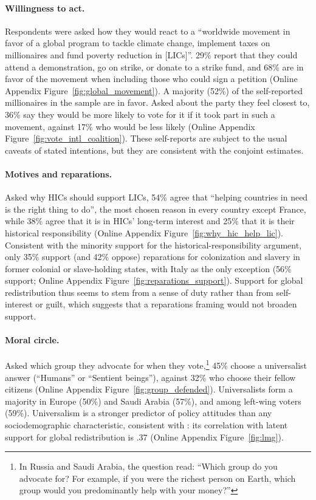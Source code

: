 \documentclass[12pt,english]{article}
\begin{document}
\paragraph{Willingness to act.}\label{par:willingness_act} Respondents were asked how they would react to a ``worldwide movement in favor of a global program to tackle climate change, implement taxes on millionaires and fund poverty reduction in [LICs]''. 29\% report that they could attend a demonstration, go on strike, or donate to a strike fund, and 68\% are in favor of the movement when including those who could sign a petition (Online Appendix Figure~\ref{fig:global_movement}). A majority (52\%) of the self-reported millionaires in the sample are in favor. Asked about the party they feel closest to, 36\% say they would be more likely to vote for it if it took part in such a movement, against 17\% who would be less likely (Online Appendix Figure~\ref{fig:vote_intl_coalition}). These self-reports are subject to the usual caveats of stated intentions, but they are consistent with the conjoint estimates.

\paragraph{Motives and reparations.}\label{par:why_help_lic}\label{par:reparations} Asked why HICs should support LICs, 54\% agree that ``helping countries in need is the right thing to do'', the most chosen reason in every country except France, while 38\% agree that it is in HICs' long-term interest and 25\% that it is their historical responsibility (Online Appendix Figure~\ref{fig:why_hic_help_lic}). Consistent with the minority support for the historical-responsibility argument, only 35\% support (and 42\% oppose) reparations for colonization and slavery in former colonial or slave-holding states, with Italy as the only exception (56\% support; Online Appendix Figure~\ref{fig:reparations_support}). Support for global redistribution thus seems to stem from a sense of duty rather than from self-interest or guilt, which suggests that a reparations framing would not broaden support.

\paragraph{Moral circle.}\label{par:group_defended} Asked which group they advocate for when they vote,\footnote{In Russia and Saudi Arabia, the question read: ``Which group do you advocate for? For example, if you were the richest person on Earth, which group would you predominantly help with your money?''\label{fn:group_defended}} 45\% choose a universalist answer (``Humans'' or ``Sentient beings''), against 32\% who choose their fellow citizens (Online Appendix Figure~\ref{fig:group_defended}). Universalists form a majority in Europe (50\%) and Saudi Arabia (57\%), and among left-wing voters (59\%). Universalism is a stronger predictor of policy attitudes than any sociodemographic characteristic, consistent with \cite{enke_moral_2023}: its correlation with latent support for global redistribution is .37 (Online Appendix Figure~\ref{fig:lmg}).
\end{document}

